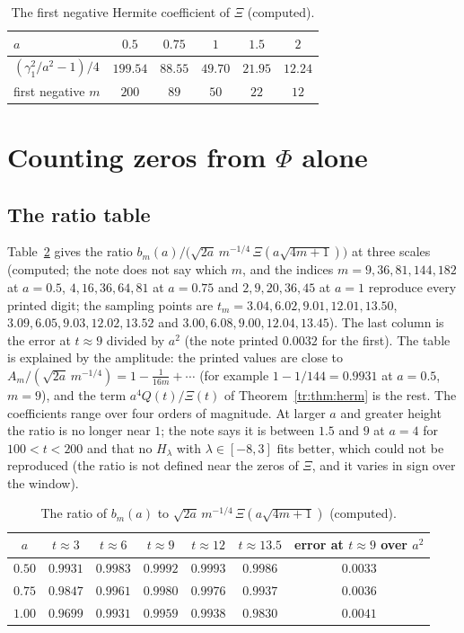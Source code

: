 \begin{table}[h]\centering\small
\begin{tabular}{lccccc}
\toprule
$a$ & $0.5$ & $0.75$ & $1$ & $1.5$ & $2$\\
\midrule
$(\gamma_1^2/a^2-1)/4$ & $199.54$ & $88.55$ & $49.70$ & $21.95$ & $12.24$\\
first negative $m$ & $200$ & $89$ & $50$ & $22$ & $12$\\
\bottomrule
\end{tabular}
\caption{The first negative Hermite coefficient of $\Xi$ (computed).}\label{tr:tab:first}
\end{table}

\section{Counting zeros from $\Phi$ alone}\label{tr:sec:count}

\subsection{The ratio table}

Table~\ref{tr:tab:ratio} gives the ratio $b_m(a)\big/\big(\sqrt{2a}\,m^{-1/4}\,\Xi(a\sqrt{4m+1})\big)$ at three scales (computed; the note does not say which $m$, and the indices $m=9,36,81,144,182$ at $a=0.5$, $4,16,36,64,81$ at $a=0.75$ and $2,9,20,36,45$ at $a=1$ reproduce every printed digit; the sampling points are $t_m=3.04,6.02,9.01,12.01,13.50$, $3.09,6.05,9.03,12.02,13.52$ and $3.00,6.08,9.00,12.04,13.45$). The last column is the error at $t\approx9$ divided by $a^2$ (the note printed $0.0032$ for the first). The table is explained by the amplitude: the printed values are close to $A_m/(\sqrt{2a}\,m^{-1/4})=1-\frac1{16m}+\cdots$ (for example $1-1/144=0.9931$ at $a=0.5$, $m=9$), and the term $a^4Q(t)/\Xi(t)$ of Theorem~\ref{tr:thm:herm} is the rest. The coefficients range over four orders of magnitude. At larger $a$ and greater height the ratio is no longer near $1$; the note says it is between $1.5$ and $9$ at $a=4$ for $100<t<200$ and that no $H_\lambda$ with $\lambda\in[-8,3]$ fits better, which could not be reproduced (the ratio is not defined near the zeros of $\Xi$, and it varies in sign over the window).

\begin{table}[h]\centering\small
\begin{tabular}{ccccccc}
\toprule
$a$ & $t\approx3$ & $t\approx6$ & $t\approx9$ & $t\approx12$ & $t\approx13.5$ & error at $t\approx9$ over $a^2$\\
\midrule
$0.50$ & $0.9931$ & $0.9983$ & $0.9992$ & $0.9993$ & $0.9986$ & $0.0033$\\
$0.75$ & $0.9847$ & $0.9961$ & $0.9980$ & $0.9976$ & $0.9937$ & $0.0036$\\
$1.00$ & $0.9699$ & $0.9931$ & $0.9959$ & $0.9938$ & $0.9830$ & $0.0041$\\
\bottomrule
\end{tabular}
\caption{The ratio of $b_m(a)$ to $\sqrt{2a}\,m^{-1/4}\,\Xi(a\sqrt{4m+1})$ (computed).}\label{tr:tab:ratio}
\end{table}

